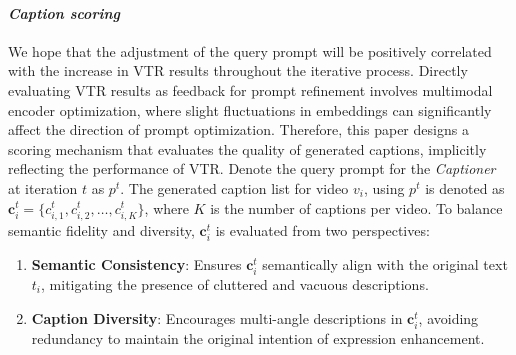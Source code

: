

\paragraph{\textbf{\textit{Caption scoring}}} 
We hope that the adjustment of the query prompt will be positively correlated with the increase in VTR results throughout the iterative process. Directly evaluating VTR results as feedback for prompt refinement involves multimodal encoder optimization, where slight fluctuations in embeddings can significantly affect the direction of prompt optimization. 
Therefore, this paper designs a scoring mechanism that evaluates the quality of generated captions, implicitly reflecting the performance of VTR.
Denote the query prompt for the \textit{Captioner} at iteration $t$ as $p^t$. The generated caption list for video $v_i$, using $p^t$ is denoted as $\mathbf{c}_i^t = \{c_{i,1}^t, c_{i,2}^t, \ldots, c_{i,K}^t\}$, where $K$ is the number of captions per video.
To balance semantic fidelity and diversity, $\mathbf{c}_i^t$ is evaluated from two perspectives:    
\begin{enumerate}
    \item \textbf{Semantic Consistency}: Ensures $\mathbf{c}_i^t$ semantically align with the original text $t_i$, mitigating the presence of cluttered and vacuous descriptions.
    \item \textbf{Caption Diversity}: Encourages multi-angle descriptions in $\mathbf{c}_i^t$, avoiding redundancy to maintain the original intention of expression enhancement.
\end{enumerate}

